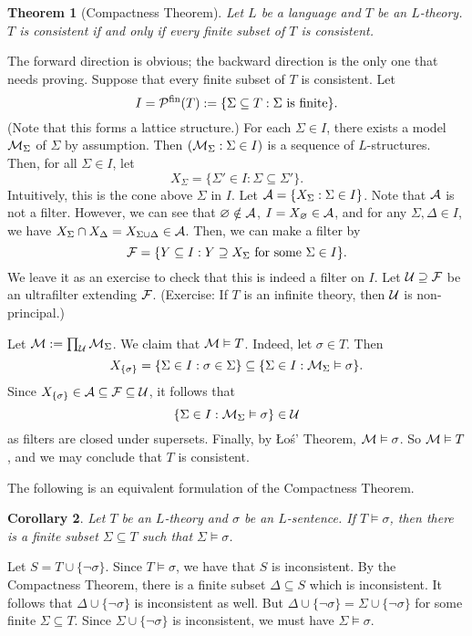 \documentclass[10pt]{article}
\makeatletter
\theoremstyle{newstyle}
\newtheorem{thm}{Theorem}[section]
\newtheorem{cor}[thm]{Corollary}
\newenvironment{pf}[1][\proofname]{\par
  \pushQED{\qed}%
  \normalfont \topsep0\p@\relax
  \trivlist
  \item[\hskip\labelsep\scshape
  #1\@addpunct{.}]\ignorespaces
}{%
  \popQED\endtrivlist\@endpefalse
}
\makeatother
\begin{document}
\begin{thm}[Compactness Theorem]
Let $L$ be a language and $T$ be an $L$-theory. $T$ is consistent if and only if every 
finite subset of $T$ is consistent.
\end{thm}
\begin{pf}
The forward direction is obvious; the backward direction is the only one that needs proving. 
Suppose that every finite subset of $T$ is consistent. Let 
\[ I = {\cal P}^{\text{fin}}(T) := \{\Sigma \subseteq T : \Sigma \text{ is finite}\}. \] 
(Note that this forms a lattice structure.) For each $\Sigma \in I$, there exists  
a model ${\cal M}_\Sigma$ of $\Sigma$ by assumption. Then $({\cal M}_\Sigma : \Sigma \in I)$ is 
a sequence of $L$-structures. Then, for all $\Sigma \in I$, let 
\[ X_\Sigma = \{\Sigma' \in I : \Sigma \subseteq \Sigma'\}. \]
Intuitively, this is the cone above $\Sigma$ in $I$. Let ${\cal A} = \{X_\Sigma : 
\Sigma \in I\}$. Note that ${\cal A}$ is not a filter. However, we can see that 
$\varnothing \notin {\cal A}$, $I = X_{\varnothing} \in {\cal A}$, and 
for any $\Sigma, \Delta \in I$, we have $X_\Sigma \cap X_\Delta = X_{\Sigma \cup \Delta} \in {\cal A}$.
Then, we can make a filter by 
\[ {\cal F} = \{Y \subseteq I : Y \supseteq X_\Sigma \text{ for some } \Sigma \in I\}. \] 
We leave it as an exercise to check that this is indeed a filter on $I$. Let 
${\cal U} \supseteq {\cal F}$ be an ultrafilter extending ${\cal F}$. (Exercise: If 
$T$ is an infinite theory, then ${\cal U}$ is non-principal.) 

Let ${\cal M} := \prod_{\cal U} {\cal M}_\Sigma$. We claim that ${\cal M} \vDash T$. 
Indeed, let $\sigma \in T$. Then 
\[ X_{\{\sigma\}} = \{\Sigma \in I : \sigma \in \Sigma\} \subseteq 
\{\Sigma \in I : {\cal M}_\Sigma \vDash \sigma\}. \]
Since $X_{\{\sigma\}} \in {\cal A} \subseteq {\cal F} \subseteq {\cal U}$, it follows that 
\[ \{\Sigma \in I : {\cal M}_\Sigma \vDash \sigma\} \in {\cal U} \] 
as filters are closed under supersets. Finally, by \L{}o\'s' Theorem, ${\cal M} \vDash \sigma$. 
So ${\cal M} \vDash T$, and we may conclude that $T$ is consistent.
\end{pf}

The following is an equivalent formulation of the Compactness Theorem.

\begin{cor}
Let $T$ be an $L$-theory and $\sigma$ be an $L$-sentence. If $T \vDash \sigma$, then there 
is a finite subset $\Sigma \subseteq T$ such that $\Sigma \vDash \sigma$. 
\end{cor}
\begin{pf}
Let $S = T \cup \{\neg \sigma\}$. Since $T \vDash \sigma$, we have that $S$ is inconsistent. 
By the Compactness Theorem, there is a finite subset $\Delta \subseteq S$ which is inconsistent. 
It follows that $\Delta \cup \{\neg \sigma\}$ is inconsistent as well. But 
$\Delta \cup \{\neg \sigma\} = \Sigma \cup \{\neg \sigma\}$ for some finite 
$\Sigma \subseteq T$. Since $\Sigma \cup \{\neg \sigma\}$ is inconsistent, 
we must have $\Sigma \vDash \sigma$. 
\end{pf}
\end{document}
